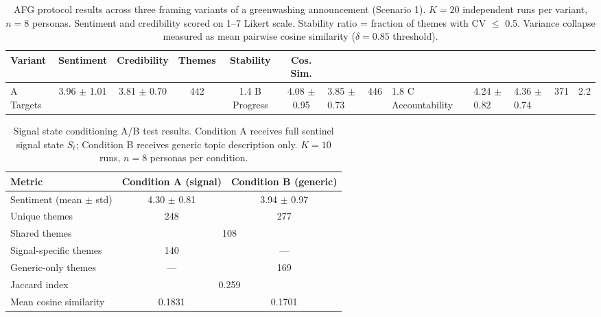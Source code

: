 \begin{table}[H]
\centering
\caption{AFG protocol results across three framing variants of a greenwashing announcement
(Scenario 1). $K=20$ independent runs per variant, $n=8$ personas. Sentiment and credibility
scored on 1--7 Likert scale. Stability ratio = fraction of themes with CV $\leq$ 0.5.
Variance collapse measured as mean pairwise cosine similarity ($\delta = 0.85$ threshold).}
\label{tab:exp1_results}
\small
\begin{tabular}{@{}lccccc@{}}
\toprule
\textbf{Variant} & \textbf{Sentiment} & \textbf{Credibility} & \textbf{Themes} & \textbf{Stability} & \textbf{Cos. Sim.} \\
\midrule
    A Targets & 3.96 $\pm$ 1.01 & 3.81 $\pm$ 0.70 & 442 & 1.4%
    B Progress & 4.08 $\pm$ 0.95 & 3.85 $\pm$ 0.73 & 446 & 1.8%
    C Accountability & 4.24 $\pm$ 0.82 & 4.36 $\pm$ 0.74 & 371 & 2.2%
\bottomrule
\end{tabular}
\end{table}


\begin{table}[H]
\centering
\caption{Signal state conditioning A/B test results. Condition A receives full sentinel
signal state $S_t$; Condition B receives generic topic description only. $K=10$ runs, $n=8$
personas per condition.}
\label{tab:exp2_ab}
\small
\begin{tabular}{@{}lcc@{}}
\toprule
\textbf{Metric} & \textbf{Condition A (signal)} & \textbf{Condition B (generic)} \\
\midrule
Sentiment (mean $\pm$ std) & 4.30 $\pm$ 0.81 & 3.94 $\pm$ 0.97 \\
Unique themes & 248 & 277 \\
Shared themes & \multicolumn{2}{c}{108} \\
Signal-specific themes & 140 & --- \\
Generic-only themes & --- & 169 \\
Jaccard index & \multicolumn{2}{c}{0.259} \\
Mean cosine similarity & 0.1831 & 0.1701 \\
\bottomrule
\end{tabular}
\end{table}


